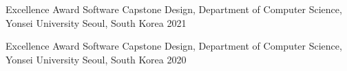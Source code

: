 


\begin{cvhonors}

  \cvhonor
    {Excellence Award} %
    {Software Capstone Design, Department of Computer Science, Yonsei University} %
    {Seoul, South Korea} %
    {2021} %

  \cvhonor
    {Excellence Award} %
    {Software Capstone Design, Department of Computer Science, Yonsei University} %
    {Seoul, South Korea} %
    {2020} %

\end{cvhonors}
